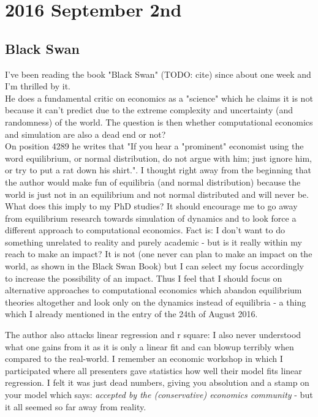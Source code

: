\section*{2016 September 2nd}
\subsection*{Black Swan}
I've been reading the book "Black Swan" (TODO: cite) since about one week and I'm thrilled by it. \\ 
He does a fundamental critic on economics as a "science" which he claims it is not because it can't predict due to the extreme complexity and uncertainty (and randomness) of the world. The question is then whether computational economics and simulation are also a dead end or not? \\
On position 4289 he writes that "If you hear a "prominent" economist using the word equilibrium, or normal distribution, do not argue with him; just ignore him, or try to put a rat down his shirt.". I thought right away from the beginning that the author would make fun of equilibria (and normal distribution) because the world is just not in an equilibrium and not normal distributed and will never be. What does this imply to my PhD studies? It should encourage me to go away from equilibrium research towards simulation of dynamics and to look force a different approach to computational economics. Fact is: I don't want to do something unrelated to reality and purely academic - but is it really within my reach to make an impact? It is not (one never can plan to make an impact on the world, as shown in the Black Swan Book) but I can select my focus accordingly to increase the possibility of an impact. Thus I feel that I should focus on alternative approaches to computational economics which abandon equilibrium theories altogether and look only on the dynamics instead of equilibria - a thing which I already mentioned in the entry of the 24th of August 2016.

\bigskip

The author also attacks linear regression and r square: I also never understood what one gains from it as it is only a linear fit and can blowup terribly when compared to the real-world. I remember an economic workshop in which I participated where all presenters gave statistics how well their model fits linear regression. I felt it was just dead numbers, giving you absolution and a stamp on your model which says: \textit{accepted by the (conservative) economics community} - but it all seemed so far away from reality.


